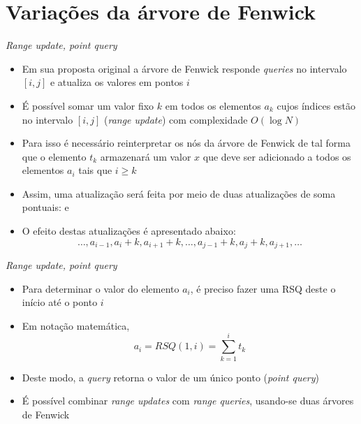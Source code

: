 \section{Variações da árvore de Fenwick}

\begin{frame}[fragile]{\textit{Range update, point query}}

    \begin{itemize}
        \item Em sua proposta original a árvore de Fenwick responde \textit{queries} no 
            intervalo $[i, j]$ e atualiza os valores em pontos $i$

        \item É possível somar um valor fixo $k$ em todos os elementos $a_k$ cujos índices estão 
            no intervalo $[i, j]$ (\textit{range update}) com complexidade $O(\log N)$

        \item Para isso é necessário reinterpretar os nós da árvore de Fenwick de tal forma
            que o elemento $t_k$ armazenará um valor $x$ que deve ser adicionado a todos
            os elementos $a_i$ tais que $i\geq k$

        \item Assim, uma atualização  será feita por meio de duas
            atualizações de soma pontuais:  e 

        \item O efeito destas atualizações é apresentado abaixo:
        \[
            \ldots, a_{i - 1}, a_i + k, a_{i + 1} + k, \ldots, a_{j - 1} + k,
                a_j + k, a_{j + 1}, \ldots
        \]
    \end{itemize}

\end{frame}

\begin{frame}[fragile]{\textit{Range update, point query}}

    \begin{itemize}
        \item Para determinar o valor do elemento $a_i$, é preciso
            fazer uma RSQ deste o início até o ponto $i$

        \item Em notação matemática,
        \[
            a_i = RSQ(1, i) = \sum_{k = 1}^i t_k
        \]

        \item Deste modo, a \textit{query} retorna o valor de um único ponto
            (\textit{point query})

        \item É possível combinar \textit{range updates} com \textit{range queries},
            usando-se duas árvores de Fenwick
    \end{itemize}

\end{frame}

